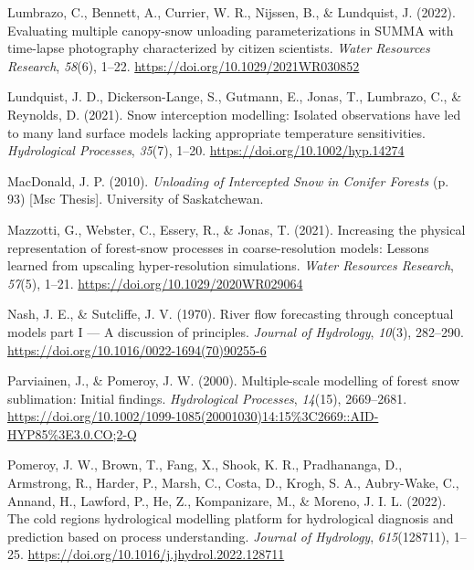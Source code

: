 \documentclass[
]{agujournal2019}
\newlength{\cslhangindent}
\newenvironment{CSLReferences}[2] %
 {\begin{list}{}{%
  \setlength{\itemindent}{0pt}
  \setlength{\leftmargin}{0pt}
  \setlength{\parsep}{0pt}
  \ifodd #1
   \setlength{\leftmargin}{\cslhangindent}
   \setlength{\itemindent}{-1\cslhangindent}
  \fi
  \setlength{\itemsep}{#2\baselineskip}}}
 {\end{list}}
\begin{document}
\begin{CSLReferences}{1}{0}
Lumbrazo, C., Bennett, A., Currier, W. R., Nijssen, B., \& Lundquist, J.
(2022). Evaluating multiple canopy-snow unloading parameterizations in
{SUMMA} with time-lapse photography characterized by citizen scientists.
\emph{Water Resources Research}, \emph{58}(6), 1--22.
\url{https://doi.org/10.1029/2021WR030852}

Lundquist, J. D., Dickerson-Lange, S., Gutmann, E., Jonas, T., Lumbrazo,
C., \& Reynolds, D. (2021). Snow interception modelling: {Isolated}
observations have led to many land surface models lacking appropriate
temperature sensitivities. \emph{Hydrological Processes}, \emph{35}(7),
1--20. \url{https://doi.org/10.1002/hyp.14274}

MacDonald, J. P. (2010). \emph{Unloading of {Intercepted Snow} in
{Conifer Forests}} (p. 93) {[}Msc Thesis{]}. University of Saskatchewan.

Mazzotti, G., Webster, C., Essery, R., \& Jonas, T. (2021). Increasing
the physical representation of forest-snow processes in
coarse-resolution models: {Lessons} learned from upscaling
hyper-resolution simulations. \emph{Water Resources Research},
\emph{57}(5), 1--21. \url{https://doi.org/10.1029/2020WR029064}

Nash, J. E., \& Sutcliffe, J. V. (1970). River flow forecasting through
conceptual models part {I} --- {A} discussion of principles.
\emph{Journal of Hydrology}, \emph{10}(3), 282--290.
\url{https://doi.org/10.1016/0022-1694(70)90255-6}

Parviainen, J., \& Pomeroy, J. W. (2000). Multiple-scale modelling of
forest snow sublimation: {Initial} findings. \emph{Hydrological
Processes}, \emph{14}(15), 2669--2681.
\url{https://doi.org/10.1002/1099-1085(20001030)14:15\%3C2669::AID-HYP85\%3E3.0.CO;2-Q}

Pomeroy, J. W., Brown, T., Fang, X., Shook, K. R., Pradhananga, D.,
Armstrong, R., Harder, P., Marsh, C., Costa, D., Krogh, S. A.,
Aubry-Wake, C., Annand, H., Lawford, P., He, Z., Kompanizare, M., \&
Moreno, J. I. L. (2022). The cold regions hydrological modelling
platform for hydrological diagnosis and prediction based on process
understanding. \emph{Journal of Hydrology}, \emph{615}(128711), 1--25.
\url{https://doi.org/10.1016/j.jhydrol.2022.128711}


\end{CSLReferences}
\end{document}
